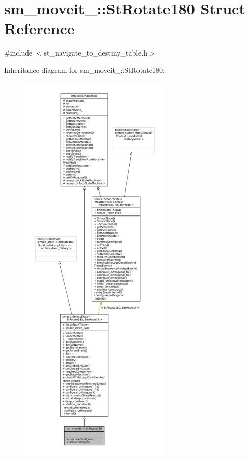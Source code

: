 \hypertarget{structsm__moveit__4_1_1StRotate180}{}\section{sm\+\_\+moveit\+\_\+:\+:St\+Rotate180 Struct Reference}
\label{structsm__moveit__4_1_1StRotate180}


{\ttfamily \#include $<$st\+\_\+navigate\+\_\+to\+\_\+destiny\+\_\+table.\+h$>$}



Inheritance diagram for sm\+\_\+moveit\+\_\+:\+:St\+Rotate180\+:
\nopagebreak
\begin{figure}[H]
\begin{center}
\leavevmode
\includegraphics[height=550pt]{structsm__moveit__4_1_1StRotate180__inherit__graph}
\end{center}
\end{figure}


